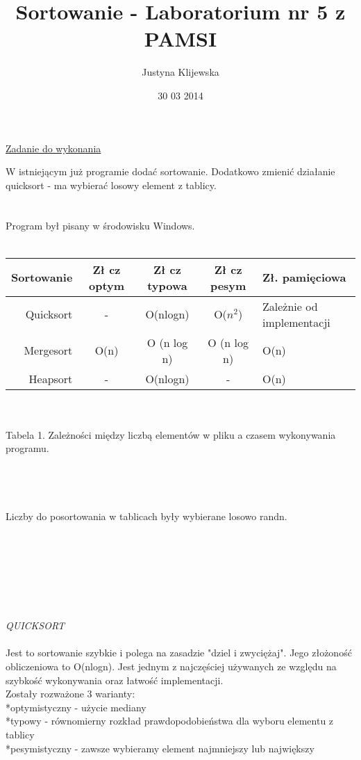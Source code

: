 \documentclass[11pt]{article}
\begin{document}
\begin{titlepage}
\title{Sortowanie - Laboratorium nr 5 z PAMSI}
\author{Justyna Klijewska}
\date{30 03 2014}
\maketitle
\end{titlepage}

\underline{Zadanie do wykonania}

W istniejącym już programie dodać sortowanie. Dodatkowo zmienić działanie quicksort - ma wybierać losowy element z tablicy.
\\ \\ \\
Program był pisany w środowisku Windows.  \\ \\
\begin{tabular}{|r|c|c|c|l|}
  \hline 
  Sortowanie &  Zł cz optym & Zł cz typowa &  Zł cz pesym & Zł. pamięciowa \\
  \hline
  Quicksort & - & O(nlogn) & O($n ^2$) & Zależnie od implementacji \\
  \hline
  Mergesort & O(n) & O (n log n) & O (n log n) & O(n) \\
  \hline
  Heapsort & -  & O(nlogn) & - &	O(n) \\
  \hline
\end{tabular} 
\\ \\ Tabela 1. Zależności między liczbą elementów w pliku a czasem wykonywania programu.
\\
\\ \\ \\ \\ 
Liczby do posortowania w tablicach były wybierane losowo randn.  \\ \\ \\
 \\ \\ \\ \\ \\
\textit{QUICKSORT}
\\ \\
Jest to sortowanie szybkie i polega na zasadzie "dziel i zwyciężaj". Jego złożoność obliczeniowa to O(nlogn). Jest jednym z najczęściej używanych ze względu na szybkość wykonywania oraz łatwość implementacji. \\
Zostały rozważone 3 warianty: \\ *optymistyczny - użycie mediany \\ *typowy - równomierny rozkład prawdopodobieństwa dla wyboru elementu z tablicy \\*pesymistyczny - zawsze wybieramy element najmniejszy lub największy
\end{document}
